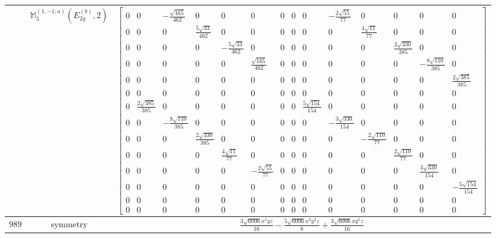 \documentclass[fleqn,8pt,landscape]{jsarticle}
\begin{document}
\begin{longtable}{ccc}
$  $ & $ \mathbb{M}_{5}^{(1,-1;a)}(E_{2g}^{(b)},2) $ & $ \begin{bmatrix} 0 & 0 & - \frac{\sqrt{165}}{462} & 0 & 0 & 0 & 0 & 0 & 0 & - \frac{2 \sqrt{55}}{77} & 0 & 0 & 0 & 0 \\ 0 & 0 & 0 & \frac{5 \sqrt{33}}{462} & 0 & 0 & 0 & 0 & 0 & 0 & \frac{4 \sqrt{11}}{77} & 0 & 0 & 0 \\ 0 & 0 & 0 & 0 & - \frac{5 \sqrt{33}}{462} & 0 & 0 & 0 & 0 & 0 & 0 & \frac{2 \sqrt{330}}{385} & 0 & 0 \\ 0 & 0 & 0 & 0 & 0 & \frac{\sqrt{165}}{462} & 0 & 0 & 0 & 0 & 0 & 0 & - \frac{8 \sqrt{110}}{385} & 0 \\ 0 & 0 & 0 & 0 & 0 & 0 & 0 & 0 & 0 & 0 & 0 & 0 & 0 & \frac{2 \sqrt{385}}{385} \\ 0 & 0 & 0 & 0 & 0 & 0 & 0 & 0 & 0 & 0 & 0 & 0 & 0 & 0 \\ 0 & \frac{2 \sqrt{385}}{385} & 0 & 0 & 0 & 0 & 0 & 0 & \frac{5 \sqrt{154}}{154} & 0 & 0 & 0 & 0 & 0 \\ 0 & 0 & - \frac{8 \sqrt{110}}{385} & 0 & 0 & 0 & 0 & 0 & 0 & - \frac{3 \sqrt{330}}{154} & 0 & 0 & 0 & 0 \\ 0 & 0 & 0 & \frac{2 \sqrt{330}}{385} & 0 & 0 & 0 & 0 & 0 & 0 & - \frac{2 \sqrt{110}}{77} & 0 & 0 & 0 \\ 0 & 0 & 0 & 0 & \frac{4 \sqrt{11}}{77} & 0 & 0 & 0 & 0 & 0 & 0 & \frac{2 \sqrt{110}}{77} & 0 & 0 \\ 0 & 0 & 0 & 0 & 0 & - \frac{2 \sqrt{55}}{77} & 0 & 0 & 0 & 0 & 0 & 0 & \frac{3 \sqrt{330}}{154} & 0 \\ 0 & 0 & 0 & 0 & 0 & 0 & 0 & 0 & 0 & 0 & 0 & 0 & 0 & - \frac{5 \sqrt{154}}{154} \\ 0 & 0 & 0 & 0 & 0 & 0 & 0 & 0 & 0 & 0 & 0 & 0 & 0 & 0 \\ 0 & 0 & 0 & 0 & 0 & 0 & 0 & 0 & 0 & 0 & 0 & 0 & 0 & 0 \end{bmatrix} $ \\ \hline
$ 989 $ & $ \text{symmetry} $ & $ \frac{3 \sqrt{6006} x^{5} y z}{16} - \frac{5 \sqrt{6006} x^{3} y^{3} z}{8} + \frac{3 \sqrt{6006} x y^{5} z}{16} $ \\

\end{longtable}
\end{document}
